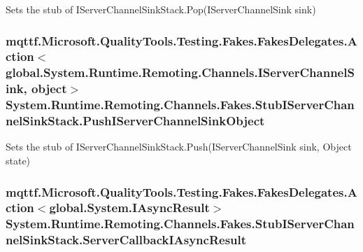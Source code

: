Sets the stub of I\-Server\-Channel\-Sink\-Stack.\-Pop(\-I\-Server\-Channel\-Sink sink)

\hypertarget{class_system_1_1_runtime_1_1_remoting_1_1_channels_1_1_fakes_1_1_stub_i_server_channel_sink_stack_ab93ac045e328074414bcb9a53273be13}{
\subsubsection[{Push\-I\-Server\-Channel\-Sink\-Object}]{\setlength{\rightskip}{0pt plus 5cm}mqttf.\-Microsoft.\-Quality\-Tools.\-Testing.\-Fakes.\-Fakes\-Delegates.\-Action$<$global.\-System.\-Runtime.\-Remoting.\-Channels.\-I\-Server\-Channel\-Sink, object$>$ System.\-Runtime.\-Remoting.\-Channels.\-Fakes.\-Stub\-I\-Server\-Channel\-Sink\-Stack.\-Push\-I\-Server\-Channel\-Sink\-Object}}\label{class_system_1_1_runtime_1_1_remoting_1_1_channels_1_1_fakes_1_1_stub_i_server_channel_sink_stack_ab93ac045e328074414bcb9a53273be13}


Sets the stub of I\-Server\-Channel\-Sink\-Stack.\-Push(\-I\-Server\-Channel\-Sink sink, Object state)

\hypertarget{class_system_1_1_runtime_1_1_remoting_1_1_channels_1_1_fakes_1_1_stub_i_server_channel_sink_stack_a4836f7abd133cc871da83b9aa2fcd2de}{
\subsubsection[{Server\-Callback\-I\-Async\-Result}]{\setlength{\rightskip}{0pt plus 5cm}mqttf.\-Microsoft.\-Quality\-Tools.\-Testing.\-Fakes.\-Fakes\-Delegates.\-Action$<$global.\-System.\-I\-Async\-Result$>$ System.\-Runtime.\-Remoting.\-Channels.\-Fakes.\-Stub\-I\-Server\-Channel\-Sink\-Stack.\-Server\-Callback\-I\-Async\-Result}}\label{class_system_1_1_runtime_1_1_remoting_1_1_channels_1_1_fakes_1_1_stub_i_server_channel_sink_stack_a4836f7abd133cc871da83b9aa2fcd2de}


